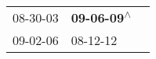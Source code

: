 \begin{supertabular}{lll}
 08-30-03\textsuperscript{} &  \textbf{09-06-09\textsuperscript{$\wedge$}} \\
 09-02-06\textsuperscript{} &                   08-12-12\textsuperscript{} \\
\end{supertabular}

